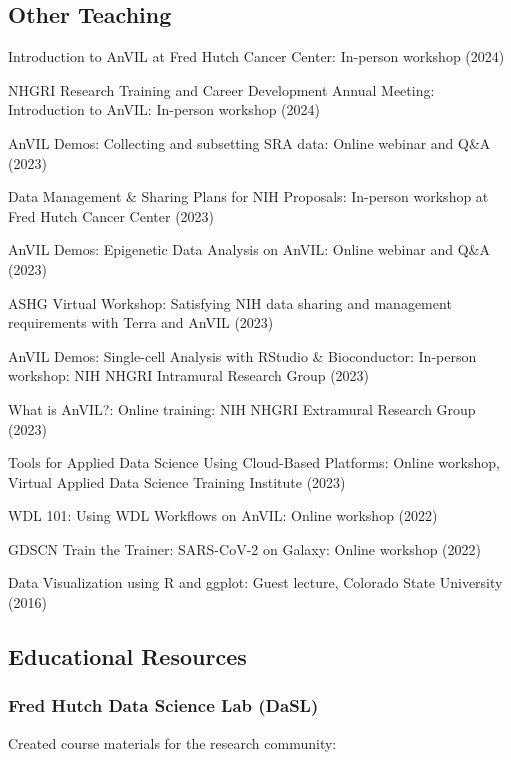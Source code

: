 \documentclass{cv}
\begin{document}
\subsection*{Other Teaching}

Introduction to AnVIL at Fred Hutch Cancer Center: In-person workshop (2024)

NHGRI Research Training and Career Development Annual Meeting: Introduction to AnVIL: In-person workshop (2024)

AnVIL Demos: Collecting and subsetting SRA data: Online webinar and Q\&A (2023)

Data Management \& Sharing Plans for NIH Proposals: In-person workshop at Fred Hutch Cancer Center (2023)

AnVIL Demos: Epigenetic Data Analysis on AnVIL: Online webinar and Q\&A (2023)

ASHG Virtual Workshop: Satisfying NIH data sharing and management requirements with Terra and AnVIL (2023)

AnVIL Demos: Single-cell Analysis with RStudio \& Bioconductor: In-person workshop: NIH NHGRI Intramural Research Group (2023)

What is AnVIL?: Online training: NIH NHGRI Extramural Research Group (2023)

Tools for Applied Data Science Using Cloud-Based Platforms: Online workshop, Virtual Applied Data Science Training Institute (2023)

WDL 101: Using WDL Workflows on AnVIL: Online workshop (2022)

GDSCN Train the Trainer: SARS-CoV-2 on Galaxy: Online workshop (2022)

Data Visualization using R and ggplot: Guest lecture, Colorado State University (2016)

\subsection*{Educational Resources}

\subsubsection*{Fred Hutch Data Science Lab (DaSL)}

Created course materials for the research community: 
\end{document}
